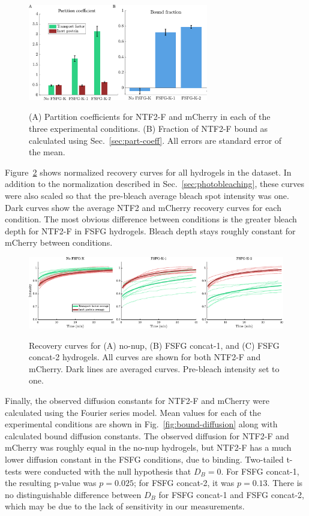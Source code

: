 \begin{figure}
\caption{(A) Partition coefficients for NTF2-F and mCherry in each of the three experimental conditions.  (B) Fraction of NTF2-F bound as calculated using Sec.~\ref{sec:part-coeff}.  All errors are standard error of the mean.\\}
\centering
\includegraphics[width=0.7\textwidth]{figs/ch04/fraction-bound}
\label{fig:frac-bound}
\end{figure} 

Figure~\ref{fig:curves} shows normalized recovery curves for all hydrogels in the dataset.  In addition to the normalization described in Sec.~\ref{sec:photobleaching}, these curves were also scaled so that the pre-bleach average bleach spot intensity was one.  Dark curves show the average NTF2 and mCherry recovery curves for each condition.  The most obvious difference between conditions is the greater bleach depth for NTF2-F in FSFG hydrogels.  Bleach depth stays roughly constant for mCherry between conditions.

\begin{figure}
\caption{Recovery curves for (A) no-nup, (B) FSFG concat-1, and (C) FSFG concat-2 hydrogels.  All curves are shown for both NTF2-F and mCherry.  Dark lines are averaged curves.  Pre-bleach intensity set to one. \\}
\centering
\includegraphics[width=\textwidth]{figs/ch04/curves}
\label{fig:curves}
\end{figure} 

Finally, the observed diffusion constants for NTF2-F and mCherry were calculated using the Fourier series model.  Mean values for each of the experimental conditions are shown in Fig.~\ref{fig:bound-diffusion} along with calculated bound diffusion constants.  The observed diffusion for NTF2-F and mCherry was roughly equal in the no-nup hydrogels, but NTF2-F has a much lower diffusion constant in the FSFG conditions, due to binding.  Two-tailed t-tests were conducted with the null hypothesis that $D_B = 0$.  For FSFG concat-1, the resulting p-value was $p = 0.025$; for FSFG concat-2, it was $p = 0.13$.  There is no distinguishable difference between $D_B$ for FSFG concat-1 and FSFG concat-2, which may be due to the lack of sensitivity in our measurements.


